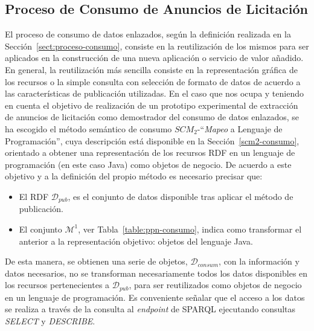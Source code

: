 \subsection{Proceso de Consumo de Anuncios de Licitación}
El proceso de consumo de datos enlazados, según la definición realizada en la Sección~\ref{sect:proceso-consumo}, consiste en 
la reutilización de los mismos para ser aplicados en la construcción de una nueva aplicación o servicio de valor 
añadido. En general, la reutilización más sencilla consiste en la representación gráfica de los recursos o la simple 
consulta con selección de formato de datos de acuerdo a las características de publicación utilizadas. En el caso 
que nos ocupa y teniendo en cuenta el objetivo de realización de un prototipo experimental de extracción de anuncios 
de licitación como demostrador del consumo de datos enlazados, se ha escogido el método semántico de consumo $SCM_2$-``\textit{Mapeo} a Lenguaje de Programación'', 
cuya descripción está disponible en la Sección~\ref{scm2-consumo}, orientado a obtener una representación de los recursos RDF en un 
lenguaje de programación (en este caso Java) como objetos de negocio. De acuerdo a este objetivo y a la definición del propio método 
es necesario precisar que:
\begin{itemize}
 \item El \dataset RDF $\mathcal{D}_{pub}$, es el conjunto de datos disponible tras aplicar el método de publicación.
 \item El conjunto $\mathcal{M}^1$, ver Tabla~\ref{table:ppn-consumo}, indica como transformar el \dataset anterior a la representación objetivo: objetos del lenguaje Java.
\end{itemize}
% 
De esta manera, se obtienen una serie de objetos, $\mathcal{D}_{consum}$, con la información y datos necesarios, no se transforman necesariamente todos los datos disponibles en los recursos pertenecientes 
a  $\mathcal{D}_{pub}$, para ser reutilizados como objetos de negocio en un lenguaje de programación. Es conveniente señalar que el acceso a los datos se realiza a través 
de la consulta al \textit{endpoint} de \gls{SPARQL} ejecutando consultas \textit{SELECT} y \textit{DESCRIBE}.

